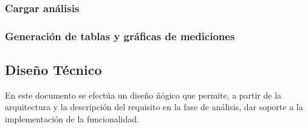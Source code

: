 \documentclass[a4paper,12pt]{article}
\begin{document}
\subsubsection{Cargar análisis}
\subsubsection{Generación de tablas y gráficas de mediciones}

\subsection{Diseño Técnico}
En este documento se efectúa un diseño ñógico que permite, a partir de la arquitectura y la descripción del requisito en la fase de análisis, dar soporte a la implementación de la funcionalidad.
\end{document}
